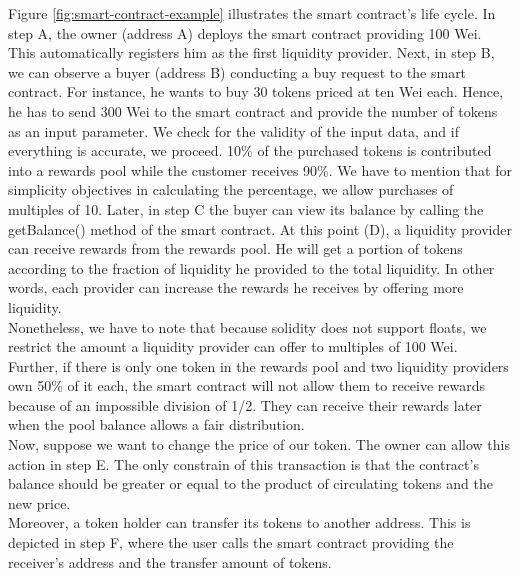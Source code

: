 \documentclass[12pt,a4paper]{article}
\begin{document}
Figure \ref{fig:smart-contract-example} illustrates the smart contract's life cycle. In
step A, the owner (address A) deploys the smart contract providing 100 Wei. This
automatically registers him as the first liquidity provider. Next, in step B, we
can observe a buyer (address B) conducting a buy request to the smart contract.
For instance, he wants to buy 30 tokens priced at ten Wei each. Hence, he has to
send 300 Wei to the smart contract and provide the number of tokens as an input
parameter. We check for the validity of the input data, and if everything is
accurate, we proceed. 10\% of the purchased tokens is contributed into a rewards
pool while the customer receives 90\%. We have to mention that for simplicity
objectives in calculating the percentage, we allow purchases of multiples of 10.
Later, in step C the buyer can view its balance by calling the getBalance()
method of the smart contract. At this point (D), a liquidity provider can
receive rewards from the rewards pool. He will get a portion of tokens according
to the fraction of liquidity he provided to the total liquidity. In other words,
each provider can increase the rewards he receives by offering more liquidity.
\\

Nonetheless, we have to note that because solidity does not support floats, we
restrict the amount a liquidity provider can offer to multiples of 100 Wei.
Further, if there is only one token in the rewards pool and two liquidity
providers own 50\% of it each, the smart contract will not allow them to receive
rewards because of an impossible division of 1/2. They can receive their rewards
later when the pool balance allows a fair distribution. \\

Now, suppose we want to change the price of our token. The owner can allow this
action in step E. The only constrain of this transaction is that the contract's
balance should be greater or equal to the product of circulating tokens and the
new price. \\

Moreover, a token holder can transfer its tokens to another address. This is
depicted in step F, where the user calls the smart contract providing the
receiver's address and the transfer amount of tokens. \\
\end{document}
